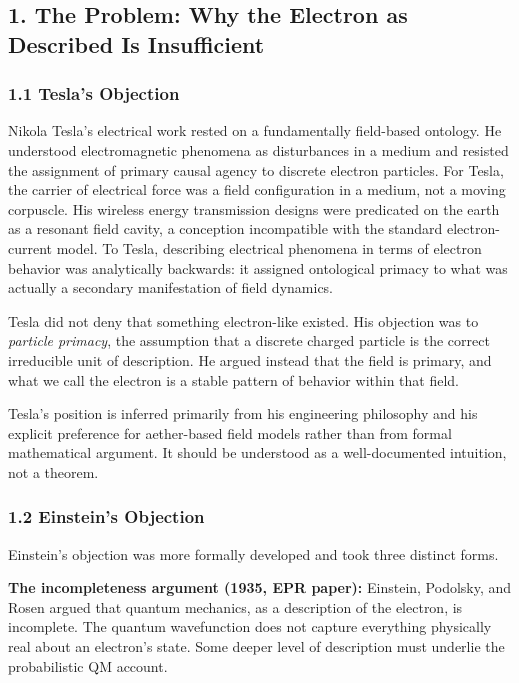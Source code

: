 \documentclass[
  11pt,
  letterpaper,
]{article}
\begin{document}
\subsection{1. The Problem: Why the Electron as Described Is
Insufficient}\label{the-problem-why-the-electron-as-described-is-insufficient}

\subsubsection{1.1 Tesla's Objection}\label{teslas-objection}

Nikola Tesla's electrical work rested on a fundamentally field-based
ontology. He understood electromagnetic phenomena as disturbances in a
medium and resisted the assignment of primary causal agency to discrete
electron particles. For Tesla, the carrier of electrical force was a
field configuration in a medium, not a moving corpuscle. His wireless
energy transmission designs were predicated on the earth as a resonant
field cavity, a conception incompatible with the standard
electron-current model. To Tesla, describing electrical phenomena in
terms of electron behavior was analytically backwards: it assigned
ontological primacy to what was actually a secondary manifestation of
field dynamics.

Tesla did not deny that something electron-like existed. His objection
was to \emph{particle primacy}, the assumption that a discrete charged
particle is the correct irreducible unit of description. He argued
instead that the field is primary, and what we call the electron is a
stable pattern of behavior within that field.

Tesla's position is inferred primarily from his engineering philosophy
and his explicit preference for aether-based field models rather than
from formal mathematical argument. It should be understood as a
well-documented intuition, not a theorem.

\subsubsection{1.2 Einstein's Objection}\label{einsteins-objection}

Einstein's objection was more formally developed and took three distinct
forms.

\textbf{The incompleteness argument (1935, EPR paper):} Einstein,
Podolsky, and Rosen argued that quantum mechanics, as a description of
the electron, is incomplete. The quantum wavefunction does not capture
everything physically real about an electron's state. Some deeper level
of description must underlie the probabilistic QM account.
\end{document}
